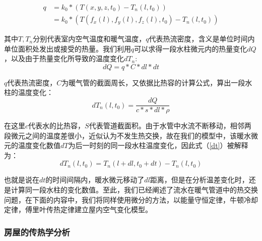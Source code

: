 \documentclass{my_paper}
\begin{document}
\begin{equation}
    \begin{aligned}
        q&= k_0*(T(x,y,z,t_0)-T_n(l,t_0))\\
        &= k_0 * (T(f_x(l),f_y(l),f_z(l),t_0)-T_n(l,t_0))
    \end{aligned}
\end{equation}

其中$T,T_n$分别代表室内空气温度和暖气温度，$q$代表热流密度，含义是单位时间内单位面积处发出或接受的热量。我们利用$ q $可以求得一段水柱微元内的热量变化$dQ$，以及由于热量变化所导致的温度变化$dT_n$:
\begin{equation}
    dQ = q* C * dl * dt
\end{equation}

$q$代表热流密度，$C$为暖气管的截面周长，又依据比热容的计算公式，算出一段水柱的温度变化：
\begin{equation}
    dT_n(l,t_0) = \frac{dQ}{c*s*dl*\rho}
    \label{dt}
\end{equation}

在这里$c$代表水的比热容，$S$代表管道截面积。由于水管中水流不断移动，相邻两段微元之间的温度差很小，近似认为不发生热交换，故在我们的模型中，该暖水微元的温度变化数值$dT$为后一时刻的同一段水柱温度变化，因此式（\ref{dt}）被解释为：
\begin{equation}
dT_n(l,t_0) = T_n(l+dl,t_0+dt) - T_n(l,t_0)
\label{}
\end{equation}

也就是说在$ dt $的时间间隔内，暖水微元移动了$dl$距离，但是在分析温差变化时，还是计算同一段水柱的变化数值。至此，我们已经阐述了流水在暖气管道中的热交换问题，在下面的内容中，我们将同样使用微分的方法，以能量守恒定律，牛顿冷却定律，傅里叶传热定律建立屋内空气变化模型。

\subsubsection{房屋的传热学分析}
\end{document}
